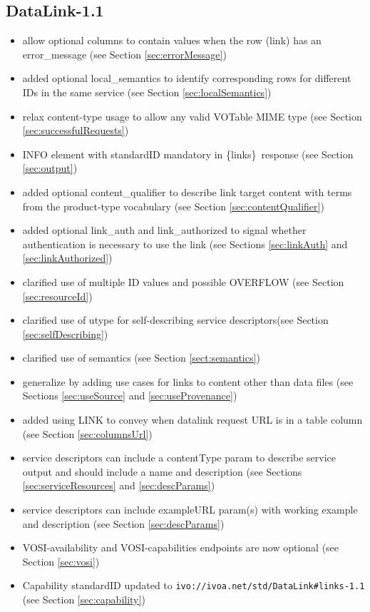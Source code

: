 \documentclass[11pt,a4paper]{ivoa}
\newcommand{\blinks}{\{links\}}
\begin{document}
\subsection{DataLink-1.1}

\begin{itemize}
\item allow optional columns to contain values when the row (link) has an error\_message
(see Section \ref{sec:errorMessage})
\item added optional local\_semantics to identify corresponding rows
	for different IDs in the same service (see Section \ref{sec:localSemantics})
\item relax content-type usage to allow any valid VOTable MIME type (see Section
  \ref{sec:successfulRequests})
\item INFO element with standardID mandatory in \blinks\ response (see Section
  \ref{sec:output})
\item added optional content\_qualifier to describe link target content with terms from
the product-type vocabulary (see Section \ref{sec:contentQualifier})
\item added optional link\_auth and link\_authorized to signal whether authentication
is necessary to use the link (see Sections \ref{sec:linkAuth} and
\ref{sec:linkAuthorized})
\item clarified use of multiple ID values and possible OVERFLOW (see Section
  \ref{sec:resourceId})
\item clarified use of utype for self-describing service descriptors(see Section
  \ref{sec:selfDescribing})
\item clarified use of semantics (see Section \ref{sect:semantics})
\item generalize by adding use cases for links to content other than data files
  (see Sections \ref{sec:useSource} and \ref{sec:useProvenance})
\item added using LINK to convey when datalink request URL is in a table column
  (see Section \ref{sec:columnsUrl})
\item service descriptors can include a contentType param to describe service
output and should include a name and description (see Sections \ref{sec:serviceResources}
and \ref{sec:descParams})
\item service descriptors can include exampleURL param(s) with working example
and description (see Section \ref{sec:descParams})
\item VOSI-availability and VOSI-capabilities endpoints are now optional (see
  Section \ref{sec:vosi})
\item Capability standardID updated to
  \verb|ivo://ivoa.net/std/DataLink#links-1.1|
  (see Section \ref{sec:capability})
\end{itemize}
\end{document}
